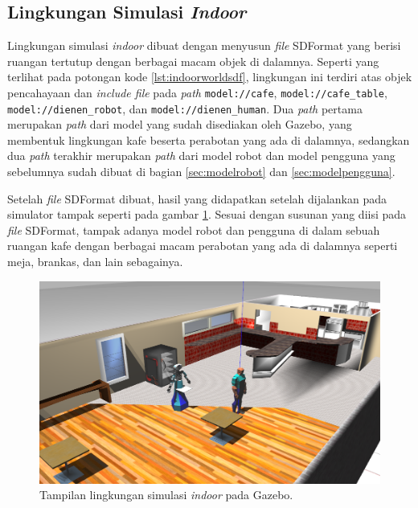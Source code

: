 \subsection{Lingkungan Simulasi \emph{Indoor}}
\label{subsec:lingkunganindoor}

Lingkungan simulasi \emph{indoor} dibuat dengan menyusun \emph{file} SDFormat yang berisi ruangan tertutup dengan berbagai macam objek di dalamnya.
Seperti yang terlihat pada potongan kode \ref{lst:indoorworldsdf},
  lingkungan ini terdiri atas objek pencahayaan dan \emph{include file} pada \emph{path} \lstinline{model://cafe}, \lstinline{model://cafe_table}, \lstinline{model://dienen_robot}, dan \lstinline{model://dienen_human}.
Dua \emph{path} pertama merupakan \emph{path} dari model yang sudah disediakan oleh Gazebo,
  yang membentuk lingkungan kafe beserta perabotan yang ada di dalamnya,
  sedangkan dua \emph{path} terakhir merupakan \emph{path} dari model robot dan model pengguna yang sebelumnya sudah dibuat di bagian \ref{sec:modelrobot} dan \ref{sec:modelpengguna}.



Setelah \emph{file} SDFormat dibuat,
  hasil yang didapatkan setelah dijalankan pada simulator tampak seperti pada gambar \ref{fig:lingkunganindoor}.
Sesuai dengan susunan yang diisi pada \emph{file} SDFormat,
  tampak adanya model robot dan pengguna di dalam sebuah ruangan kafe dengan berbagai macam perabotan yang ada di dalamnya seperti meja, brankas, dan lain sebagainya.

\begin{figure}[ht]
  \centering
  \includegraphics[scale=0.23]{gambar/lingkungan-indoor.png}
  \caption{Tampilan lingkungan simulasi \emph{indoor} pada Gazebo.}
  \label{fig:lingkunganindoor}
\end{figure}
